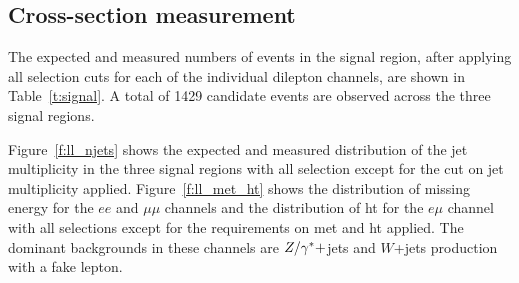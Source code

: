 \subsection{Cross-section measurement}
\label{s:nobtagging}


The expected and measured numbers of events in the signal region,
after applying all selection cuts for each of the individual
dilepton channels, are shown in Table~\ref{t:signal}. A total of
1429 %
candidate events are observed across the three signal regions.



Figure~\ref{f:ll_njets} shows the expected and measured distribution
of the jet multiplicity in the three signal regions with all selection
except for the cut on jet multiplicity applied.
Figure~\ref{f:ll_met_ht} shows the distribution of missing energy for the
$ee$ and $\mu\mu$ channels and the distribution of ht for the $e\mu$
channel with all selections except for the requirements on met and
ht applied.
The dominant backgrounds in these channels are $Z/\gamma^{*} +$jets and $W$+jets
production with a fake lepton.

